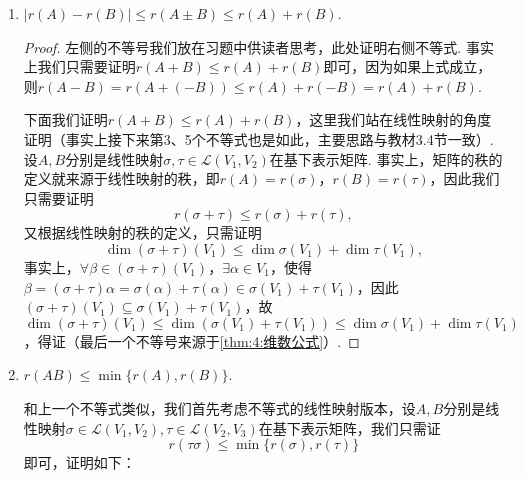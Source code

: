 \begin{enumerate}
\begin{proof}
\begin{enumerate}
\begin{align*}
\begin{pmatrix}
            \end{pmatrix},
        \end{align*}
        故可以得到$r(A)+r(B)+r(C)\geqslant r\begin{pmatrix}
                A & O \\ C & B
            \end{pmatrix}\geqslant r(A)+r(B)$，同理可证$r(A)+r(B)+r(D)\geqslant r\begin{pmatrix}
                A & D \\ O & B
            \end{pmatrix}\geqslant r(A)+r(B)$.
    \end{enumerate}
    \end{proof}
    \item $|r(A)-r(B)|\leqslant r(A\pm B) \leqslant r(A)+r(B)$.

          \begin{proof}
            左侧的不等号我们放在习题中供读者思考，此处证明右侧不等式. 事实上我们只需要证明$r(A+B)\leqslant r(A)+r(B)$即可，因为如果上式成立，则$r(A-B)=r(A+(-B))\leqslant r(A)+r(-B)=r(A)+r(B)$.

            下面我们证明$r(A+B)\leqslant r(A)+r(B)$，这里我们站在线性映射的角度证明（事实上接下来第3、5个不等式也是如此，主要思路与教材3.4节一致）. 设$A,B$分别是线性映射$\sigma,\tau\in\mathcal{L}(V_1,V_2)$在基下表示矩阵. 事实上，矩阵的秩的定义就来源于线性映射的秩，即$r(A)=r(\sigma)$，$r(B)=r(\tau)$，因此我们只需要证明
            \[r(\sigma+\tau)\leqslant r(\sigma)+r(\tau),\]
            又根据线性映射的秩的定义，只需证明
            \[\dim(\sigma+\tau)(V_1)\leqslant \dim\sigma(V_1)+\dim\tau(V_1),\]
            事实上，$\forall\beta\in(\sigma+\tau)(V_1)$，$\exists\alpha\in V_1$，使得$\beta=(\sigma+\tau)\alpha=\sigma(\alpha)+\tau(\alpha)\in\sigma(V_1)+\tau(V_1)$，因此$(\sigma+\tau)(V_1)\subseteq\sigma(V_1)+\tau(V_1)$，故$\dim(\sigma+\tau)(V_1)\leqslant \dim(\sigma(V_1)+\tau(V_1))\leqslant \dim\sigma(V_1)+\dim\tau(V_1)$，得证（最后一个不等号来源于\autoref{thm:4:维数公式}）.
          \end{proof}

    \item $r(AB) \leqslant \min\{r(A), r(B)\}$.

          和上一个不等式类似，我们首先考虑不等式的线性映射版本，设$A,B$分别是线性映射$\sigma\in\mathcal{L}(V_1,V_2),\tau\in\mathcal{L}(V_2,V_3)$在基下表示矩阵，我们只需证
            \[r(\tau\sigma)\leqslant \min\{r(\sigma), r(\tau)\}\]
          即可，证明如下：


\end{enumerate}
